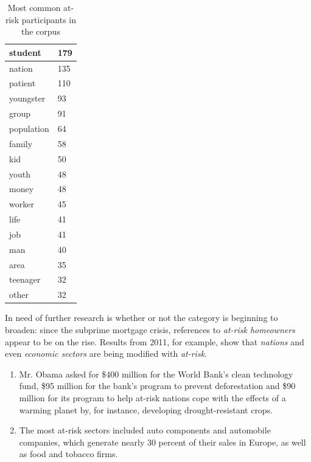 \begin{table}[htb!]
{\begin{minipage}{.37\textwidth}
\begin{tabularx}{1.0\textwidth}{|X|l|}
			student    & 179   \\ \hline
			nation     & 135   \\ \hline
			patient    & 110   \\ \hline
			youngster  & 93    \\ \hline
			group      & 91    \\ \hline
			population & 64    \\ \hline
			family     & 58    \\ \hline
			kid        & 50    \\ \hline
			youth      & 48    \\ \hline
			money      & 48    \\ \hline
			worker     & 45    \\ \hline
			life       & 41    \\ \hline
			job        & 41    \\ \hline
			man        & 40    \\ \hline
			area       & 35    \\ \hline
			teenager   & 32    \\ \hline
			other & 32 \\ \hline
			\end{tabularx}
			\caption{Most common at-risk participants in the corpus}
			\label{tab:atrisk}
			\end{minipage}}%
			\end{table}

        In need of further research is whether or not the category is beginning to broaden: since the subprime mortgage crisis, references to \emph{at-risk homeowners} appear to be on the rise. Results from 2011, for example, show that \emph{nations} and even \emph{economic sectors} are being modified with \emph{at-risk}.

        \begin{enumerate}  [before=\itshape,font=\normalfont] \setlength\itemsep{0em} \small
        \item Mr. Obama asked for \$400 million for the World Bank's clean technology fund, \$95 million for the bank's program to prevent deforestation and \$90 million for its program to help at-risk nations cope with the effects of a warming planet by, for instance, developing drought-resistant crops.
        \item The most at-risk sectors included auto components and automobile companies, which generate nearly 30 percent of their sales in Europe, as well as food and tobacco firms.
        \end{enumerate}
        

